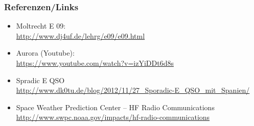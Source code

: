 \begin{frame}
    \frametitle{Referenzen/Links}
    
    \footnotesize
    \begin{itemize}
        \item Moltrecht E 09: \\
              \url{http://www.dj4uf.de/lehrg/e09/e09.html}
        \item Aurora (Youtube): \\
              \url{https://www.youtube.com/watch?v=izYiDDt6d8s}
        \item Spradic E QSO \\
              \url{http://www.dk0tu.de/blog/2012/11/27_Sporadic-E_QSO_mit_Spanien/}
	\item Space Weather Prediction Center -- HF Radio Communications \\
	      \url{http://www.swpc.noaa.gov/impacts/hf-radio-communications}
    \end{itemize}

\end{frame}


